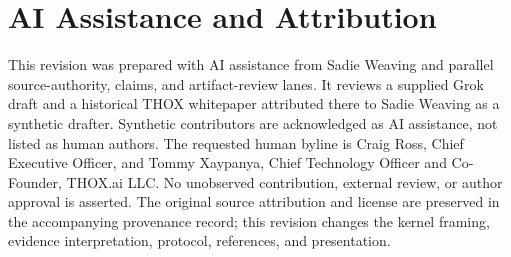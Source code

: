 \documentclass[11pt,a4paper]{article}
\begin{document}
\section*{AI Assistance and Attribution}
This revision was prepared with AI assistance from Sadie Weaving and parallel source-authority, claims, and artifact-review lanes. It reviews a supplied Grok draft and a historical THOX whitepaper attributed there to Sadie Weaving as a synthetic drafter. Synthetic contributors are acknowledged as AI assistance, not listed as human authors. The requested human byline is Craig Ross, Chief Executive Officer, and Tommy Xaypanya, Chief Technology Officer and Co-Founder, THOX.ai LLC. No unobserved contribution, external review, or author approval is asserted. The original source attribution and license are preserved in the accompanying provenance record; this revision changes the kernel framing, evidence interpretation, protocol, references, and presentation.

\begingroup
\raggedright


\endgroup
\end{document}
